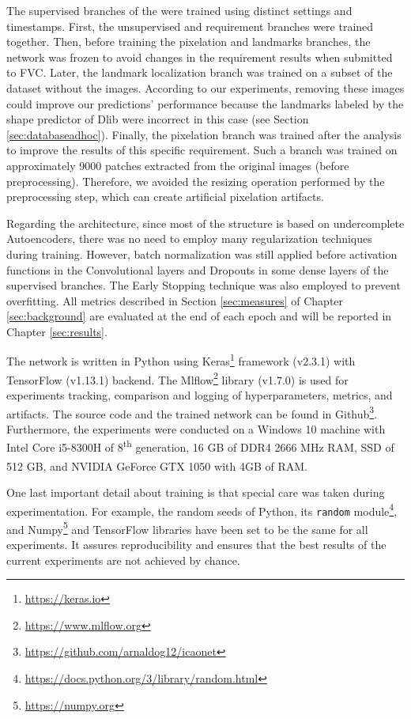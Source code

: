 The supervised branches of the \methodname were trained using distinct settings and timestamps. First, the unsupervised and requirement branches were trained together. Then, before training the pixelation and landmarks branches, the network was frozen to avoid changes in the requirement results when submitted to FVC. Later, the landmark localization branch was trained on a subset of the \adhoc dataset without the \darktintedlenses images. According to our experiments, removing these images could improve our predictions' performance because the landmarks labeled by the shape predictor of Dlib were incorrect in this case (see Section \ref{sec:databaseadhoc}). Finally, the pixelation branch was trained after the analysis to improve the results of this specific requirement. Such a branch was trained on approximately 9000 patches extracted from the original images (before preprocessing). Therefore, we avoided the resizing operation performed by the preprocessing step, which can create artificial pixelation artifacts.
 
Regarding the architecture, since most of the \methodname structure is based on undercomplete Autoencoders, there was no need to employ many regularization techniques during training. However, batch normalization was still applied before activation functions in the Convolutional layers and Dropouts in some dense layers of the supervised branches. The Early Stopping technique was also employed to prevent overfitting. All metrics described in Section \ref{sec:measures} of Chapter \ref{sec:background} are evaluated at the end of each epoch and will be reported in Chapter \ref{sec:results}.
 
The network is written in Python using Keras\footnote{\url{https://keras.io}} framework (v2.3.1) with TensorFlow (v1.13.1) backend. The Mlflow\footnote{\url{https://www.mlflow.org}} library (v1.7.0) is used for experiments tracking, comparison and logging of hyperparameters, metrics, and artifacts. The source code and the trained network can be found in Github\footnote{\url{https://github.com/arnaldog12/icaonet}}. Furthermore, the experiments were conducted on a Windows 10 machine with Intel\textsuperscript{\tiny\textregistered} Core\textsuperscript{\tiny\texttrademark} i5-8300H of 8\textsuperscript{th} generation, 16 GB of DDR4 2666 MHz RAM, SSD of 512 GB, and NVIDIA\textsuperscript{\tiny\textregistered} GeForce\textsuperscript{\tiny\textregistered} GTX 1050 with 4GB of RAM.
 
One last important detail about \methodname training is that special care was taken during experimentation. For example, the random seeds of Python, its \texttt{random} module\footnote{\url{https://docs.python.org/3/library/random.html}}, and Numpy\footnote{\url{https://numpy.org}} and TensorFlow libraries have been set to be the same for all experiments. It assures reproducibility and ensures that the best results of the current experiments are not achieved by chance.
 
